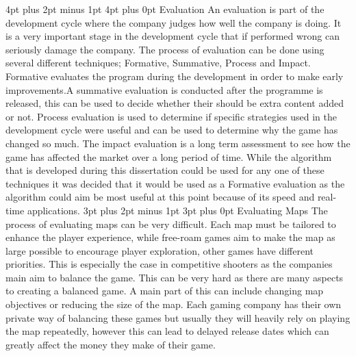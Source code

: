 \documentclass[12pt,a4paper,oneside]{book}
\makeatletter
\renewcommand\subsection{\@startsection {subsection}{1}{2mm} %
                               {3pt plus 2pt minus 1pt} %
                               {3pt plus 0pt} %
                               {\normalfont\bfseries}}
\renewcommand\section{\@startsection {section}{1}{0mm} %
                               {4pt plus 2pt minus 1pt} %
                               {4pt plus 0pt} %
                               {\bfseries}}
\makeatother
\begin{document}
\section{Evaluation}
An evaluation is part of the development cycle where the company judges how well the company is doing. It is a very important stage in the development cycle that if performed wrong can seriously damage the company. The process of evaluation can be done using several different techniques; Formative, Summative, Process and Impact. Formative evaluates the program during the development in order to make early improvements.A summative evaluation is conducted after the programme is released, this can be used to decide whether their should be extra content added or not. Process evaluation is used to determine if specific strategies used in the development cycle were useful and can be used to determine why the game has changed so much. The impact evaluation is a long term assessment to see how the game has affected the market over a long period of time. While the algorithm that is developed during this dissertation could be used for any one of these techniques it was decided that it would be used as a Formative evaluation as the algorithm could aim be most useful at this point because of its speed and real-time applications.  
\subsection{Evaluating Maps}  
 The process of evaluating maps can be very difficult. Each map must be tailored to enhance the player experience, while free-roam games aim to make the map as large  possible to encourage player exploration, other games have different priorities. This is especially the case in competitive shooters as the companies main aim to balance the game. This can be very hard as there are many aspects to creating a balanced game. A main part of this can include changing map objectives or reducing the size of the map. Each gaming company has their own private way of balancing these games but usually they will heavily rely on playing the map repeatedly, however this can lead to delayed release dates which can greatly affect the money they make of their game.
\vspace{5mm} 
\newline
\end{document}
